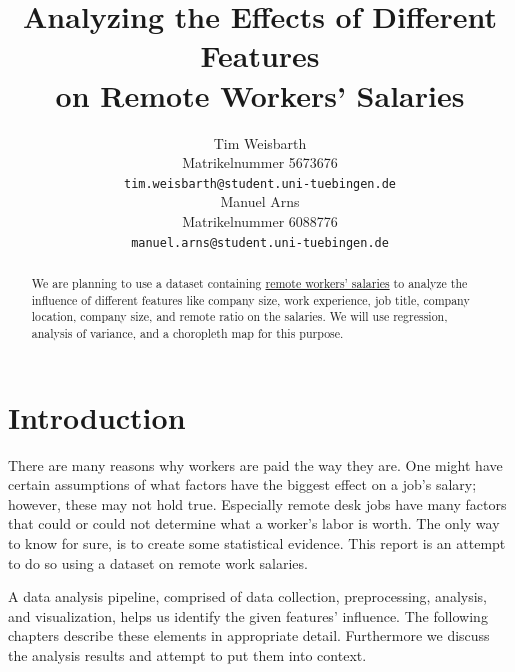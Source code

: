 \documentclass{article}
\title{Analyzing the Effects of Different Features\\ on Remote Workers' Salaries}
\author{%
  Tim Weisbarth\\
  Matrikelnummer 5673676 \\
  \texttt{tim.weisbarth@student.uni-tuebingen.de} \\
  \And
  Manuel Arns\\
  Matrikelnummer 6088776\\
  \texttt{manuel.arns@student.uni-tuebingen.de} \\
}
\begin{document}
\maketitle

\begin{abstract}
We are planning to use a dataset containing \href{https://salaries.ai-jobs.net/download/}{remote workers' salaries} to analyze the influence of different features like company size, work experience, job title, company location, company size, and remote ratio on the salaries. We will use regression, analysis of variance, and a choropleth map for this purpose.
\end{abstract}

\section{Introduction}
There are many reasons why workers are paid the way they are. One might have certain assumptions of what factors have the biggest effect on a job's salary; however, these may not hold true. Especially remote desk jobs have many factors that could or could not determine what a worker's labor is worth. The only way to know for sure, is to create some statistical evidence. This report is an attempt to do so using a dataset on remote work salaries.

A data analysis pipeline, comprised of data collection, preprocessing, analysis, and visualization, helps us identify the given features' influence. The following chapters describe these elements in appropriate detail. Furthermore we discuss the analysis results and attempt to put them into context.

\end{document}

